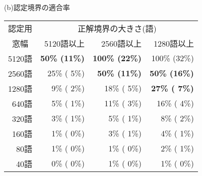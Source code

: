 \begin{table}[htbp]
\begin{center}
\begin{tabular}{|r|r|r|r|r|r|r|r|r||r|}
      \hline
    \end{tabular}
  \end{center}
  \noindent{}
  \begin{center}
    \leavevmode
    (b)認定境界の適合率\\\medskip{}
    \begin{tabular}{|r|r|r|r|}
      \hline
      \multicolumn{1}{|c|}{認定用}
        & \multicolumn{3}{|c|}{正解境界の大きさ(語)}\\ \cline{2-4}
      \multicolumn{1}{|c|}{窓幅}
        & 5120語以上& 2560語以上& 1280語以上 \\
      \hline
        5120語 &\bf 50\% (11\%) &\bf 100\% (22\%) & 100\% (32\%) \\
        2560語 & 25\% ( 5\%) &\bf 50\% (11\%) &\bf 50\% (16\%) \\
        1280語 &  9\% ( 2\%) & 18\% ( 5\%) &\bf 27\% ( 7\%) \\
         640語 &  5\% ( 1\%) & 11\% ( 3\%) & 16\% ( 4\%) \\
         320語 &  3\% ( 1\%) &  5\% ( 1\%) &  8\% ( 2\%) \\
         160語 &  1\% ( 0\%) &  3\% ( 1\%) &  4\% ( 1\%) \\
          80語 &  1\% ( 0\%) &  1\% ( 0\%) &  2\% ( 1\%) \\
          40語 &  0\% ( 0\%) &  1\% ( 0\%) &  1\% ( 0\%) \\
      \hline
    \end{tabular}\par

    \medskip{}


\end{center}
\end{table}
